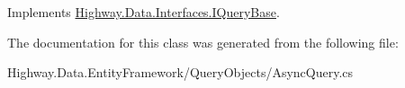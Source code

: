 Implements \hyperlink{interface_highway_1_1_data_1_1_interfaces_1_1_i_query_base_a151df3073faaf51d98207e2794f62817}{Highway.\-Data.\-Interfaces.\-I\-Query\-Base}.



The documentation for this class was generated from the following file\-:\begin{DoxyCompactItemize}
\item 
Highway.\-Data.\-Entity\-Framework/\-Query\-Objects/Async\-Query.\-cs\end{DoxyCompactItemize}
